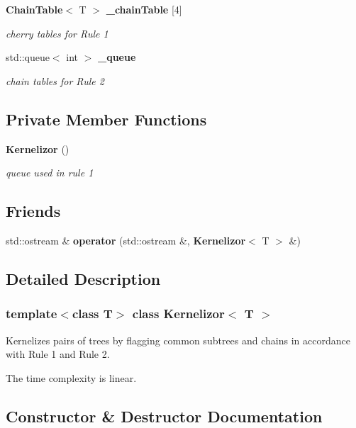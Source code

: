 \begin{CompactItemize}
{\bf Chain\-Table}$<$ T $>$ {\bf \_\-chain\-Table} [4]
\begin{CompactList}\small\item\em cherry tables for Rule 1 \item\end{CompactList}\item 
std::queue$<$ int $>$ {\bf \_\-queue}
\begin{CompactList}\small\item\em chain tables for Rule 2 \item\end{CompactList}\end{CompactItemize}
\subsection*{Private Member Functions}
\begin{CompactItemize}
\item 
{\bf Kernelizor} ()
\begin{CompactList}\small\item\em queue used in rule 1 \item\end{CompactList}\end{CompactItemize}
\subsection*{Friends}
\begin{CompactItemize}
\item 
std::ostream \& {\bf operator} (std::ostream \&, {\bf Kernelizor}$<$ T $>$ \&)
\end{CompactItemize}


\subsection{Detailed Description}
\subsubsection*{template$<$class T$>$ class Kernelizor$<$ T $>$}

Kernelizes pairs of trees by flagging common subtrees and chains in accordance with Rule 1 and Rule 2. 

The time complexity is linear. 



\subsection{Constructor \& Destructor Documentation}

